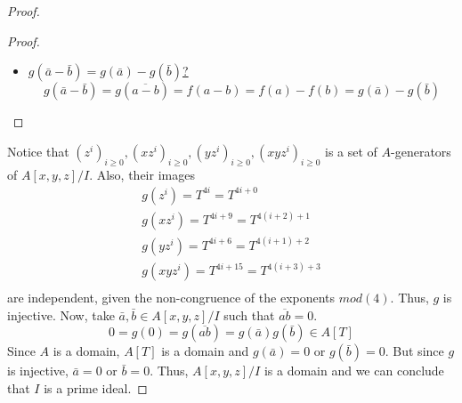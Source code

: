 \begin{problem}
\begin{sol}
\begin{proof}
\begin{claim}
\begin{proof}
\begin{itemize}
                        \item
                        \underline{$g(\bar{a} - \bar{b}) = g(\bar{a}) - g(\bar{b})$?}
                        \[ g(\bar{a} - \bar{b}) = g(\overline{a - b}) = f(a - b) = f(a) - f(b) = g(\bar{a}) - g(\bar{b}) \]
                    \end{itemize}
                \end{proof}
            \end{claim}
            Notice that $(z^i)_{i \geq 0}, (x z^i)_{i \geq 0}, (y z^i)_{i \geq 0}, ( x y z^i)_{i \geq 0}$ is a set of $A$-generators of $A[x,y,z]/I$.
            Also, their images
            \begin{align*}
            g(z^i) = T^{4i} = T^{4i + 0} \\
            g(x z^i) = T^{4i + 9} = T^{4(i + 2) + 1} \\
            g(y z^i) = T^{4i + 6} = T^{4(i + 1) + 2} \\
            g(x y z^i) = T^{4i + 15} = T^{4(i + 3) + 3} \\
            \end{align*}
            are independent, given the non-congruence of the exponents $mod(4)$.
            Thus, $g$ is injective.
            Now, take $\bar{a}, \bar{b} \in A[x,y,z]/I$ such that $\overline{ab} = 0$.
            \[ 0 = g(0) = g(\overline{ab}) = g(\bar{a})g(\bar{b}) \in A[T] \]
            Since $A$ is a domain, $A[T]$ is a domain and $g(\bar{a}) = 0$ or $g(\bar{b}) = 0$.
            But since $g$ is injective, $\bar{a} = 0$ or $\bar{b} = 0$.
            Thus, $A[x,y,z]/I$ is a domain and we can conclude that $I$ is a prime ideal.
        \end{proof}
    \end{sol}
\end{problem}